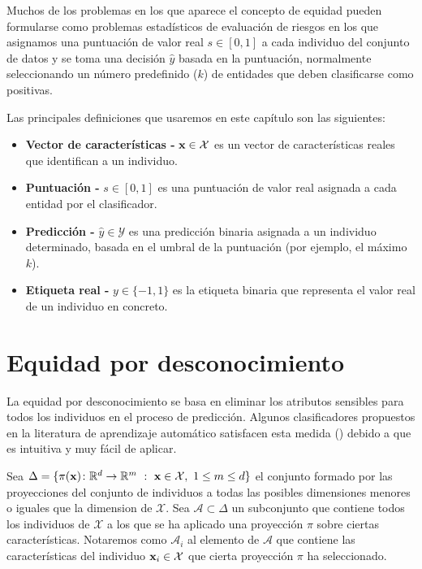 \documentclass[oneside,openright,titlepage,numbers=noenddot,openany,headinclude,footinclude=true,
cleardoublepage=empty,abstractoff,BCOR=5mm,paper=a4,fontsize=12pt,main=spanish]{scrreprt}
\begin{document}
Muchos de los problemas en los que aparece el concepto de equidad pueden formularse como problemas estadísticos de evaluación de riesgos en los que asignamos una puntuación de valor real $s \in [0,1]$ a cada individuo del conjunto de datos y se toma una decisión $\hat{y}$
basada en la puntuación, normalmente seleccionando un número predefinido ($k$) de
entidades que deben clasificarse como positivas.

Las principales definiciones que usaremos en este capítulo son las siguientes:

\begin{itemize}
    \item \textbf{Vector de características -} $\textbf{x}\in \mathcal{X}$ es un vector de características reales que identifican a un individuo.
    \item \textbf{Puntuación -} $s \in [0,1]$ es una puntuación de valor real asignada a cada entidad por el clasificador.
    \item \textbf{Predicción -} $\hat{y} \in \mathcal{Y}$ es una predicción binaria asignada a un individuo determinado, basada en el umbral de la puntuación (por ejemplo, el máximo $k$).
    \item \textbf{Etiqueta real -} $y \in \{-1,1\}$ es la etiqueta binaria que representa el valor real de un individuo en concreto.
\end{itemize}

\section{Equidad por desconocimiento}

\label{sec:eqdesconocimiento}

La equidad por desconocimiento se basa en eliminar los atributos sensibles para todos los individuos en el proceso de predicción. Algunos clasificadores propuestos en la literatura de aprendizaje automático satisfacen esta medida (\cite{detect2012}) debido a que es intuitiva y muy fácil de aplicar.

\begin{notation}
Sea $\Delta=\{ \pi(\textbf{x})\colon \mathbb{R}^d \to \mathbb{R}^m  \ : \ \textbf{x} \in \mathcal{X}, \ 1 \leq m \leq d\}$ el conjunto formado por las proyecciones del conjunto de individuos a todas las posibles dimensiones menores o iguales que la dimension de $\mathcal{X}$. Sea $\mathcal{A} \subset \Delta$ un subconjunto que contiene todos los individuos de $\mathcal{X}$ a los que se ha aplicado una proyección $\pi$ sobre ciertas características. Notaremos como $\mathcal{A}_i$ al elemento de $\mathcal{A}$ que contiene las características del individuo $\textbf{x}_i\in \mathcal{X}$ que cierta proyección $\pi$ ha seleccionado.
\end{notation}\
\end{document}
